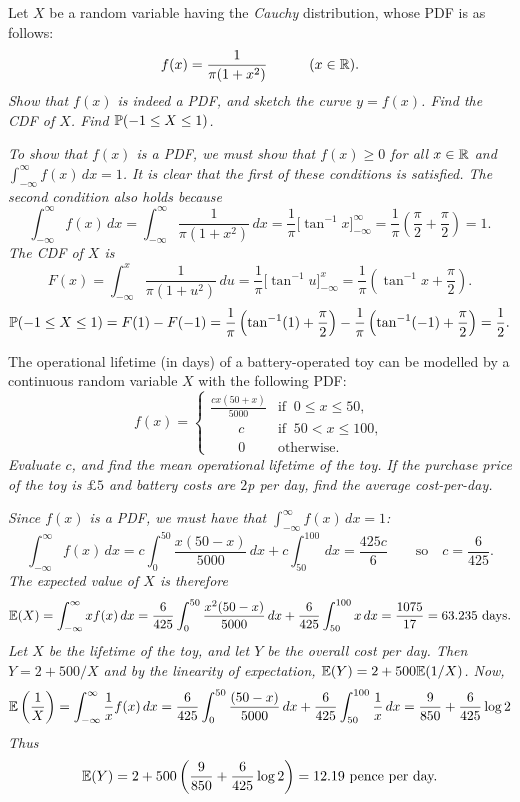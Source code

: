 \begin{exercise}
\begin{questions}
\question
Let $X$ be a random variable having the \emph{Cauchy} distribution, whose PDF is as follows:
\[
f(x) = 	\frac{1}{\pi(1+x^2)}\quad\qquad (x\in\mathbb{R}).
\]
\ben
\it Show that $f(x)$ is indeed a PDF, and sketch the curve $y=f(x)$.
\it Find the CDF of $X$.
\it Find $\mathbb{P}(-1\leq X\leq 1)$.
\een

\begin{answer}
\ben
\it %
To show that $f(x)$ is a PDF, we must show that $f(x)\geq 0$ for all $x\in\mathbb{R}$ and $\int_{-\infty}^{\infty} f(x)\,dx = 1$. It is clear that the first of these conditions is satisfied. The second condition also holds because
\[
\int_{-\infty}^{\infty} f(x)\,dx 
	= \int_{-\infty}^{\infty} \frac{1}{\pi(1+x^2)}\,dx 
	= \frac{1}{\pi}\big[\tan^{-1} x\big]_{-\infty}^{\infty}
	= \frac{1}{\pi}\left(\frac{\pi}{2}+\frac{\pi}{2}\right)
	= 1.
\]
\it %
The CDF of $X$ is
\[
F(x) 
	= \int_{-\infty}^{x} \frac{1}{\pi(1+u^2)}\,du 
	= \frac{1}{\pi}\big[\tan^{-1} u\big]_{-\infty}^{x}
	= \frac{1}{\pi}\left(\tan^{-1} x + \frac{\pi}{2}\right).
\]	
\it %
\[
\mathbb{P}(-1\leq X\leq 1) = F(1) - F(-1) = \frac{1}{\pi}\left(\tan^{-1}(1) + \frac{\pi}{2}\right) - \frac{1}{\pi}\left(\tan^{-1}(-1) + \frac{\pi}{2}\right) = \frac{1}{2}.
\]
\een
\end{answer}

\question
The operational lifetime (in days) of a battery-operated toy can be modelled by a continuous random variable $X$ with the following PDF:
\[
f(x) = \begin{cases}
	\displaystyle\frac{cx(50+x)}{5000} 	& \text{if }\ 0\leq x\leq 50,\\[1ex]
	\qquad c						& \text{if }\ 50< x\leq 100,\\[1ex]
	\qquad 0		  				& \text{otherwise.}		
\end{cases}
\]
\ben
\it Evaluate $c$, and find the mean operational lifetime of the toy.
\it If the purchase price of the toy is $\pounds 5$ and battery costs are $2$p per day, find the average cost-per-day.
\een
\begin{answer}
\ben
\it %
Since $f(x)$ is a PDF, we must have that $\int_{-\infty}^{\infty} f(x)\,dx = 1$:
\[
\int_{-\infty}^{\infty} f(x)\,dx 
	= c\int_0^{50} \frac{x(50-x)}{5000}\,dx + c\int_{50}^{100}\,dx 
	= \frac{425c}{6}\qquad\text{so}\quad c = \frac{6}{425}.	
\]
The expected value of $X$ is therefore
\[
\mathbb{E}(X) 
	= \int_{-\infty}^{\infty} xf(x)\,dx
	= \frac{6}{425}\int_0^{50} \frac{x^2(50-x)}{5000}\,dx + \frac{6}{425}\int_{50}^{100} x\,dx 
	= \frac{1075}{17}
	= 63.235\text{ days.}
\]
\it %
Let $X$ be the lifetime of the toy, and let $Y$ be the overall cost per day. Then $Y = 2 + 500/X$ and by the linearity of expectation, $\mathbb{E}(Y) = 2 + 500\mathbb{E}(1/X)$. Now,
\[
\mathbb{E}\left(\frac{1}{X}\right)
	= \int_{-\infty}^{\infty} \frac{1}{x}f(x)\,dx
	= \frac{6}{425}\int_0^{50} \frac{(50-x)}{5000}\,dx + \frac{6}{425}\int_{50}^{100}\frac{1}{x}\,dx 
	= \frac{9}{850} + \frac{6}{425}\log 2
\]
Thus
\[
\mathbb{E}(Y) = 2 + 500\left(\frac{9}{850} + \frac{6}{425}\log 2\right) = 12.19\text{ pence per day.}
\]
\een
\end{answer}


\end{questions}
\end{exercise}
